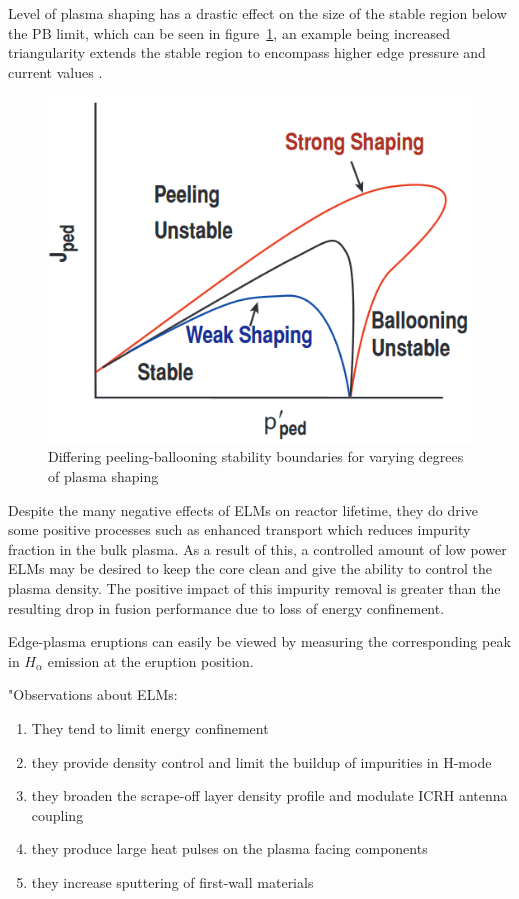 \documentclass[12pt]{article}  %
\newcommand{\citep}[1]{\cite{#1}}
\begin{document}
Level of plasma shaping has a drastic effect on the size of the stable region below the PB limit, which can be seen in figure~\ref{fig:PBshaping}, an example being increased triangularity extends the stable region to encompass higher edge pressure and current values \cite{Lang2013}.

\begin{figure}
\includegraphics[scale=0.6]{Figures/PBshaping.png}
\centering
\caption{Differing peeling-ballooning stability boundaries for varying degrees of plasma shaping \cite{Snyder2004}}\label{fig:PBshaping}
\end{figure}

Despite the many negative effects of ELMs on reactor lifetime, they do drive some positive processes such as enhanced transport which reduces impurity fraction in the bulk plasma. As a result of this, a controlled amount of low power ELMs may be desired to keep the core clean and give the ability to control the plasma density.\citep{Hill1997} The positive impact of this impurity removal is greater than the resulting drop in fusion performance due to loss of energy confinement.\cite{Connor2008}





Edge-plasma eruptions can easily be viewed by measuring the corresponding peak in $H_{\alpha}$ emission at the eruption position.\citep{Hill1997}

"Observations about ELMs: 
\begin{enumerate}
\item They tend to limit energy confinement
\item they provide density control and limit the buildup of impurities in H-mode
\item they broaden the scrape-off layer density profile and modulate ICRH antenna coupling
\item they produce large heat pulses on the plasma facing components 
\item they increase sputtering of first-wall materials
\end{enumerate}
\end{document}
